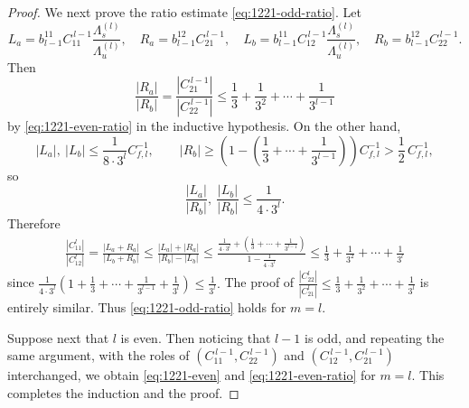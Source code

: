 \documentclass{amsart}
\theoremstyle{plain}
\theoremstyle{definition}
\theoremstyle{remark}
\numberwithin{equation}{section}
\begin{document}
\begin{proof}
We next prove the ratio estimate \eqref{eq:1221-odd-ratio}.
Let
\[
L_a=b_{l-1}^{11}C_{11}^{\,l-1}\frac{\Lambda_s^{(l)}}{\Lambda_u^{(l)}},
\quad
R_a=b_{l-1}^{12}C_{21}^{\,l-1},\quad
L_b=b_{l-1}^{11}C_{12}^{\,l-1}\frac{\Lambda_s^{(l)}}{\Lambda_u^{(l)}},
\quad
R_b=b_{l-1}^{12}C_{22}^{\,l-1}.
\]
Then
\[
\frac{|R_a|}{|R_b|}
=
\frac{|C_{21}^{\,l-1}|}{|C_{22}^{\,l-1}|}
\le
\frac{1}{3}+\frac{1}{3^2}+\cdots +\frac{1}{3^{l-1}}
\]
by \eqref{eq:1221-even-ratio} in the inductive hypothesis. On the other hand,
\[
|L_a|,\ |L_b|
\le
\frac{1}{8\cdot 3^l}C_{f,l}^{-1},
\qquad
|R_b|
\ge
\left(1-\left(\frac{1}{3}+\cdots +\frac{1}{3^{l-1}}\right)\right)C_{f,l}^{-1}
>
\frac12\,C_{f,l}^{-1},
\]
so
\[
\frac{|L_a|}{|R_b|},\ \frac{|L_b|}{|R_b|}
\le
\frac{1}{4\cdot 3^l}.
\]
Therefore
\begin{align*}
\frac{|C_{11}^{l}|}{|C_{12}^{l}|}
=
\frac{|L_a+R_a|}{|L_b+R_b|}
\le
\frac{|L_a|+|R_a|}{|R_b|-|L_b|}
\le
\frac{\frac{1}{4\cdot 3^l}
+\left(\frac{1}{3}+\cdots +\frac{1}{3^{l-1}}\right)}
{1-\frac{1}{4\cdot 3^l}}
\le
\frac{1}{3}+\frac{1}{3^2}+\cdots +\frac{1}{3^{l}}
\end{align*}
since
$
\frac{1}{4\cdot 3^l}
(
1+\frac{1}{3}+\cdots +\frac{1}{3^{l-1}}+\frac{1}{3^l}
)
\le \frac{1}{3^l}.
$
The proof of
$
\frac{|C_{22}^{l}|}{|C_{21}^{l}|}
\le
\frac{1}{3}+\frac{1}{3^2}+\cdots +\frac{1}{3^{l}}
$
is entirely similar. Thus \eqref{eq:1221-odd-ratio}
holds for $m=l$.

Suppose next that $l$ is even. Then noticing that $l-1$ is odd, 
and repeating the same argument, with the roles of
$(C_{11}^{\,l-1},C_{22}^{\,l-1})$ and $(C_{12}^{\,l-1},C_{21}^{\,l-1})$
interchanged, we obtain
\eqref{eq:1221-even} and \eqref{eq:1221-even-ratio}
for $m=l$.
This completes the induction and the proof.
\end{proof}
\end{document}
